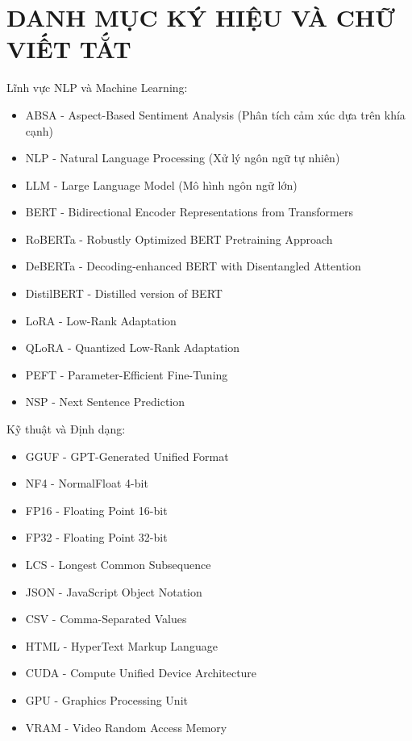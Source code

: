 ﻿\documentclass[14pt]{extreport}
\begin{document}
\tableofcontents

\newpage
\section{DANH MỤC KÝ HIỆU VÀ CHỮ VIẾT TẮT}
Lĩnh vực NLP và Machine Learning:
\begin{itemize}
    \item ABSA - Aspect-Based Sentiment Analysis (Phân tích cảm xúc dựa trên khía cạnh)
    \item NLP - Natural Language Processing (Xử lý ngôn ngữ tự nhiên)
    \item LLM - Large Language Model (Mô hình ngôn ngữ lớn)
    \item BERT - Bidirectional Encoder Representations from Transformers
    \item RoBERTa - Robustly Optimized BERT Pretraining Approach
    \item DeBERTa - Decoding-enhanced BERT with Disentangled Attention
    \item DistilBERT - Distilled version of BERT
    \item LoRA - Low-Rank Adaptation
    \item QLoRA - Quantized Low-Rank Adaptation
    \item PEFT - Parameter-Efficient Fine-Tuning
    \item NSP - Next Sentence Prediction
\end{itemize}

Kỹ thuật và Định dạng:
\begin{itemize}
    \item GGUF - GPT-Generated Unified Format
    \item NF4 - NormalFloat 4-bit
    \item FP16 - Floating Point 16-bit
    \item FP32 - Floating Point 32-bit
    \item LCS - Longest Common Subsequence
    \item JSON - JavaScript Object Notation
    \item CSV - Comma-Separated Values
    \item HTML - HyperText Markup Language
    \item CUDA - Compute Unified Device Architecture
    \item GPU - Graphics Processing Unit
    \item VRAM - Video Random Access Memory
\end{itemize}
\end{document}
